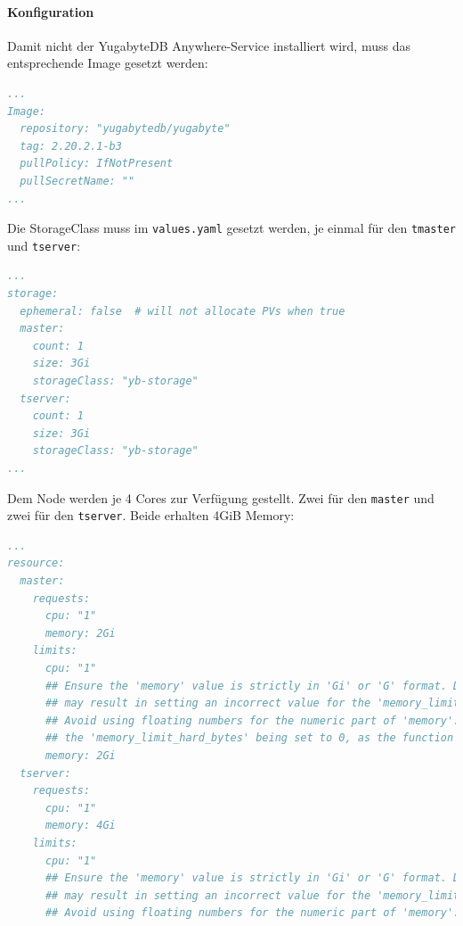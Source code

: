 \begin{flushleft}
    \paragraph{Konfiguration}
    Damit nicht der YugabyteDB Anywhere-Service installiert wird, muss das entsprechende Image gesetzt werden:
    \lstset{style=gra_codestyle}
    \begin{lstlisting}[language=yaml, caption=yugabyteDB - Helm Chart Manifest - Detail Image,captionpos=b,label={lst:yugabytedb-image-setting},breaklines=true]
...
Image:
  repository: "yugabytedb/yugabyte"
  tag: 2.20.2.1-b3
  pullPolicy: IfNotPresent
  pullSecretName: ""
...
    \end{lstlisting}
    Die StorageClass muss im \texttt{values.yaml} gesetzt werden, je einmal für den \texttt{tmaster} und \texttt{tserver}:
    \lstset{style=gra_codestyle}
    \begin{lstlisting}[language=yaml, caption=yugabyteDB - Helm Chart Manifest - Detail StorageClass,captionpos=b,label={lst:yugabytedb-storageclass-setting},breaklines=true]
...
storage:
  ephemeral: false  # will not allocate PVs when true
  master:
    count: 1
    size: 3Gi
    storageClass: "yb-storage"
  tserver:
    count: 1
    size: 3Gi
    storageClass: "yb-storage"
...
    \end{lstlisting}
    Dem Node werden je 4 Cores zur Verfügung gestellt.
    Zwei für den \texttt{master} und zwei für den \texttt{tserver}.
    Beide erhalten 4GiB Memory:
    \lstset{style=gra_codestyle}
    \begin{lstlisting}[language=yaml, caption=yugabyteDB - Helm Chart Manifest - Detail Resources,captionpos=b,label={lst:yugabytedb-resources-setting},breaklines=true]
...
resource:
  master:
    requests:
      cpu: "1"
      memory: 2Gi
    limits:
      cpu: "1"
      ## Ensure the 'memory' value is strictly in 'Gi' or 'G' format. Deviating from these formats
      ## may result in setting an incorrect value for the 'memory_limit_hard_bytes' flag.
      ## Avoid using floating numbers for the numeric part of 'memory'. Doing so may lead to
      ## the 'memory_limit_hard_bytes' being set to 0, as the function expects integer values.
      memory: 2Gi
  tserver:
    requests:
      cpu: "1"
      memory: 4Gi
    limits:
      cpu: "1"
      ## Ensure the 'memory' value is strictly in 'Gi' or 'G' format. Deviating from these formats
      ## may result in setting an incorrect value for the 'memory_limit_hard_bytes' flag.
      ## Avoid using floating numbers for the numeric part of 'memory'. Doing so may lead to

\end{lstlisting}
\end{flushleft}
